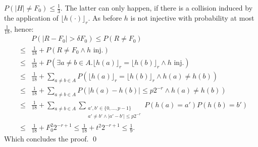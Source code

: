 \documentclass[11pt,a4paper]{article}
\newcommand{\size}[1]{\lvert#1\rvert}
\begin{document}
$P(\size{H} \neq F_0) \leq \frac{1}{3}$.
The latter can only happen, if there is a collision induced by the application of $\lfloor h(\cdot)\rfloor_r$. As before $h$ is not injective with probability at most $\frac{1}{18}$, hence:
\begin{eqnarray*}
    & & P\left( \size{R - F_0} > \delta F_0\right) \leq P\left( R \neq F_0 \right) \\
    & \leq & \frac{1}{18} + P\left( R \neq F_0 \wedge h \textrm{ inj.} \right) \\
    & \leq & \frac{1}{18} + P\left( \exists a \neq b \in A. \lfloor h(a) \rfloor_r = \lfloor h(b) \rfloor_r \wedge h \textrm{ inj.} \right) \\
    & \leq & \frac{1}{18} + \sum_{a \neq b \in A} P\left(\lfloor h(a) \rfloor_r = \lfloor h(b) \rfloor_r \wedge h(a) \neq h(b) \right) \\
    & \leq & \frac{1}{18} + \sum_{a \neq b \in A} P\left(\size{h(a) - h(b)} \leq p 2^{-r} \wedge h(a) \neq h(b) \right) \\
    & \leq & \frac{1}{18} + \sum_{a \neq b \in A} \sum_{\substack{a', b' \in \{0,\ldots, p-1\} \\  a' \neq b' \wedge \size{a'-b'} \leq p 2^{-r}}} P(h(a) = a') P(h(b)= b') \\
    & \leq & \frac{1}{18} + F_0^2 2^{-r+1} \leq \frac{1}{18} + t^2 2^{-r+1} \leq \frac{1}{9} \textrm{.}
\end{eqnarray*}
Which concludes the proof. \qed



\end{document}

